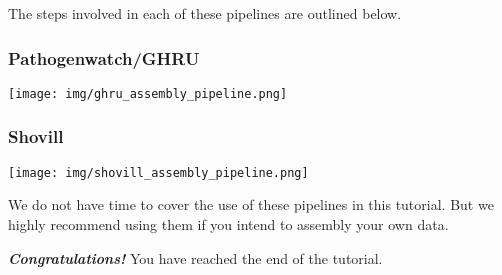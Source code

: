 \documentclass[11pt]{article}
\begin{document}
The steps involved in each of these pipelines are outlined below.

    \hypertarget{pathogenwatchghru}{%
\subsubsection{Pathogenwatch/GHRU}\label{pathogenwatchghru}}


\begin{center}
\texttt{[image: img/ghru\_assembly\_pipeline.png]}
\end{center}


    \hypertarget{shovill}{%
\subsubsection{Shovill}\label{shovill}}


\begin{center}
\texttt{[image: img/shovill\_assembly\_pipeline.png]}
\end{center}


    We do not have time to cover the use of these pipelines in this
tutorial. But we highly recommend using them if you intend to assembly
your own data.

    \textbf{\textit{Congratulations!}} You have reached the end of the
tutorial.


\end{document}
